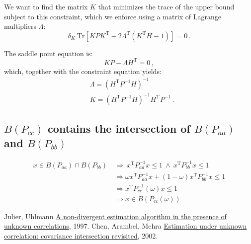 \documentclass[11pt]{article}
\newcommand{\Tr}[1]{\mathrm{Tr}\left[{#1}\right]}
\newcommand{\transpose}{\mathrm{\scriptscriptstyle T}}
\begin{document}
We want to find the matrix $K$ that minimizes the trace of the upper bound
subject to this constraint, which we enforce using a matrix of Lagrange
multipliers $\Lambda$:
\begin{equation}
    \delta_K\ \Tr{KPK^\transpose - 2\Lambda^\transpose(K^\transpose H - 1)} = 0\,.
\end{equation}

The saddle point equation is:
\begin{equation}
    KP - \Lambda H^\transpose = 0\,,
\end{equation}
which, together with the constraint equation yields:
\begin{align}
    &\Lambda = (H^\transpose P^{-1} H)^{-1} \\
    &K = (H^\transpose P^{-1} H)^{-1}H^\transpose P^{-1}\,.
\end{align}

\subsection{$B(P_{cc})$ contains the intersection of $B(P_{aa})$ and $B(P_{bb})$}
\label{proof_pcc_contains_intersection}

\begin{align}
    x \in B(P_{aa}) \cap B(P_{bb})\ &\Rightarrow\ x^\transpose P_{aa}^{-1}x \leq 1\ \land\ x^\transpose P_{bb}^{-1}x \leq 1\\
    &\Rightarrow \omega x^\transpose P_{aa}^{-1}x + (1-\omega) x^\transpose P_{bb}^{-1}x \leq 1\\
    &\Rightarrow x^\transpose P_{cc}^{-1}(\omega)x\leq 1\\
    &\Rightarrow x \in B(P_{cc}(\omega))
\end{align}


\begin{thebibliography}{9}
  Julier, Uhlmann
  \href{https://ieeexplore.ieee.org/iel3/4827/13338/00609105.pdf?casa_token=xmJ8y10BkucAAAAA:hHlQdYE1oL_zSZcqsOhZsctM8oaW9GocGzfjueZ5rj87BNId508xUH_bAQHqK1ncbRNzYZi4}{A non-divergent estimation algorithm in the presence of unknown correlations}, 
  1997.
  Chen, Arambel, Mehra
  \href{https://ieeexplore.ieee.org/document/1047015}{Estimation under unknown correlation: covariance intersection revisited}, 
  2002.
\end{thebibliography}
\end{document}
